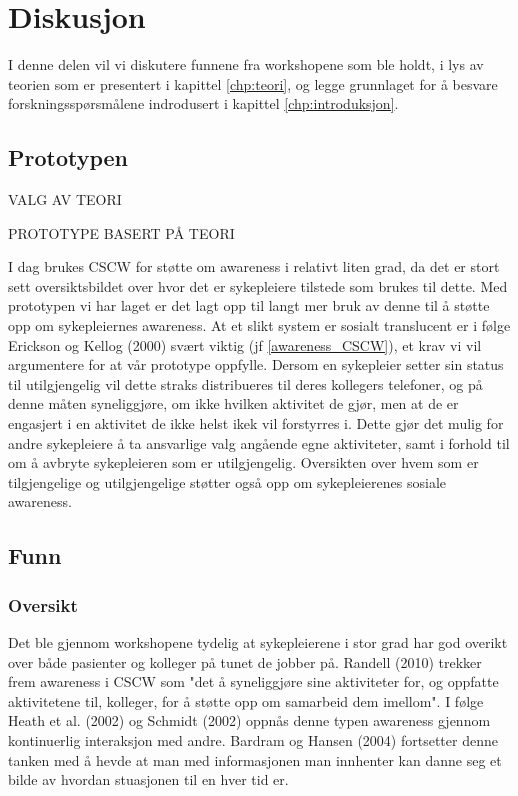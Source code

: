 \chapter{Diskusjon}
\label{chp:diskusjon}
I denne delen vil vi diskutere funnene fra workshopene som ble holdt, i lys av teorien som er presentert i kapittel \ref{chp:teori}, og legge grunnlaget for å besvare forskningsspørsmålene indrodusert i kapittel \ref{chp:introduksjon}.

\section{Prototypen}
\label{protoDisk}

VALG AV TEORI

PROTOTYPE BASERT PÅ TEORI

\noindent
I dag brukes CSCW for støtte om awareness i relativt liten grad, da det er stort sett oversiktsbildet over hvor det er sykepleiere tilstede som brukes til dette. Med prototypen vi har laget er det lagt opp til langt mer bruk av denne til å støtte opp om sykepleiernes awareness. At et slikt system er sosialt translucent er i følge Erickson og Kellog (2000) svært viktig (jf \ref{awareness_CSCW}), et krav vi vil argumentere for at vår prototype oppfylle. Dersom en sykepleier setter sin status til utilgjengelig vil dette straks distribueres til deres kollegers telefoner, og på denne måten syneliggjøre, om ikke hvilken aktivitet de gjør, men at de er engasjert i en aktivitet de ikke helst ikek vil forstyrres i. Dette gjør det mulig for andre sykepleiere å ta ansvarlige valg angående egne aktiviteter, samt i forhold til om å avbryte sykepleieren som er utilgjengelig. Oversikten over hvem som er tilgjengelige og utilgjengelige støtter også opp om sykepleierenes sosiale awareness.

\section{Funn}

\subsection{Oversikt}
\label{oversikt}
Det ble gjennom workshopene tydelig at sykepleierene i stor grad har god overikt over både pasienter og kolleger på tunet de jobber på. Randell (2010) trekker frem awareness i CSCW som "det å syneliggjøre sine aktiviteter for, og oppfatte aktivitetene til, kolleger, for å støtte opp om samarbeid dem imellom". I følge Heath et al. (2002) og Schmidt (2002) oppnås denne typen awareness gjennom kontinuerlig interaksjon med andre. Bardram og Hansen (2004) fortsetter denne tanken med å hevde at man med informasjonen man innhenter kan danne seg et bilde av hvordan stuasjonen til en hver tid er.

